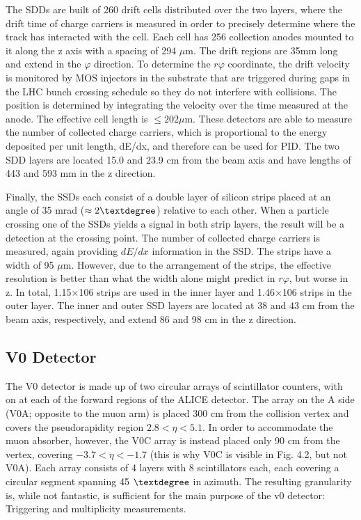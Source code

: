 The SDDs are built of 260 drift cells distributed over the two layers, where the drift time of charge carriers is measured in order to precisely determine where the track has interacted with the cell. Each cell has 256 collection anodes mounted to it along the z axis with a spacing of 294 $\mu$m. The drift regions are 35mm long and extend in the $\varphi$ direction. To determine the $r\varphi$ coordinate, the drift velocity is monitored by MOS injectors in the substrate that are triggered during gaps in the LHC bunch crossing schedule so they do not interfere with collisions. The position is determined by integrating the velocity over the time measured at the anode. The effective cell length is $\leq 202\mu$m. These detectors are able to measure the number of collected charge carriers, which is proportional to the energy deposited per unit length, dE/dx, and therefore can be used for PID. The two SDD layers are located 15.0 and 23.9 cm from the beam axis and have lengths of 443 and 593 mm in the z direction.

Finally, the SSDs each consist of a double layer of silicon strips placed at an angle of 35 mrad ($\approx 2\textdegree$) relative to each other. When a particle crossing one of the SSDs yields a signal in both strip layers, the result will be a detection at the crossing point. The number of collected charge carriers is measured, again providing $dE/dx$ information in the SSD. The strips have a width of 95 $\mu$m. However, due to the arrangement of the strips, the effective resolution is better than what the width alone might predict in $r\varphi$, but worse in z. In total, 1.15$\times$106 strips are used in the inner layer and 1.46$\times$106 strips in the outer layer. The inner and outer SSD layers are located at 38 and 43 cm from the beam axis, respectively, and extend 86 and 98 cm in the z direction.


\subsection{V0 Detector}
The V0 detector is made up of two circular arrays of scintillator counters, with on at each of the forward regions of the ALICE detector. The array on the A side (V0A; opposite to the muon arm) is placed 300 cm from the collision vertex and covers the pseudorapidity region $2.8 < \eta < 5.1$. In order to accommodate the muon absorber, however, the V0C array is instead placed only 90 cm from the vertex, covering $-3.7 < \eta < -1.7$ (this is why V0C is visible in Fig. 4.2, but not V0A). Each array consists of 4 layers with 8 scintillators each, each covering a circular segment spanning 45 $\textdegree$ in azimuth. The resulting granularity is, while not fantastic, is sufficient for the main purpose of the v0 detector: Triggering and multiplicity measurements.

